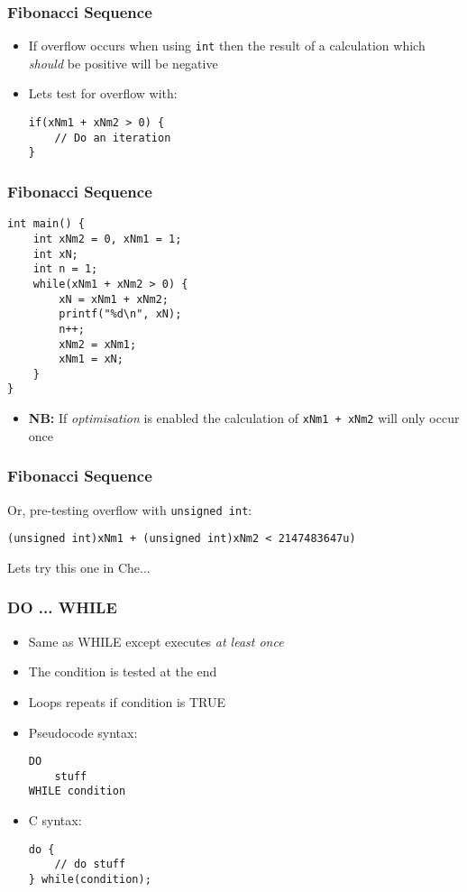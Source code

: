 \documentclass[14pt]{beamer}
\begin{document}
\begin{frame}[fragile]
\frametitle{Fibonacci Sequence}
\begin{itemize}
\item If overflow occurs when using \texttt{int} then the result of a calculation which \textit{should} be positive will be negative
\item Lets test for overflow with:\\
\begin{lstlisting}[style=CStyle]
if(xNm1 + xNm2 > 0) {
	// Do an iteration
}
\end{lstlisting}

\end{itemize}
\end{frame}

\begin{frame}[fragile]
\frametitle{Fibonacci Sequence}
\begin{lstlisting}[style=Ctable,basicstyle=\ttfamily\footnotesize]
int main() {
	int xNm2 = 0, xNm1 = 1;
	int xN;
	int n = 1;
	while(xNm1 + xNm2 > 0) {
		xN = xNm1 + xNm2;
		printf("%d\n", xN);
		n++;
		xNm2 = xNm1;
		xNm1 = xN;
	}
}
\end{lstlisting}
\begin{itemize}
\item \textbf{NB:} If \textit{optimisation} is enabled the calculation of \texttt{xNm1 + xNm2} will only occur once
\end{itemize}
\end{frame}

\begin{frame}[fragile]
\frametitle{Fibonacci Sequence}
Or, pre-testing overflow with \texttt{unsigned int}:
\begin{lstlisting}[style=Ctable,basicstyle=\ttfamily\footnotesize]
(unsigned int)xNm1 + (unsigned int)xNm2 < 2147483647u)
\end{lstlisting}
Lets try this one in Che...
\end{frame}

\begin{frame}[fragile]
\frametitle{DO ... WHILE}
\begin{itemize}
\item Same as WHILE except executes \textit{at least once}
\item The condition is tested at the end
\item Loops repeats if condition is TRUE
\item Pseudocode syntax:
\begin{lstlisting}[style=pseudo]
DO
	stuff
WHILE condition
\end{lstlisting}
\item C syntax:
\begin{lstlisting}[style=CStyle]
do {
	// do stuff
} while(condition);
\end{lstlisting}
\end{itemize}
\end{frame}
\end{document}
